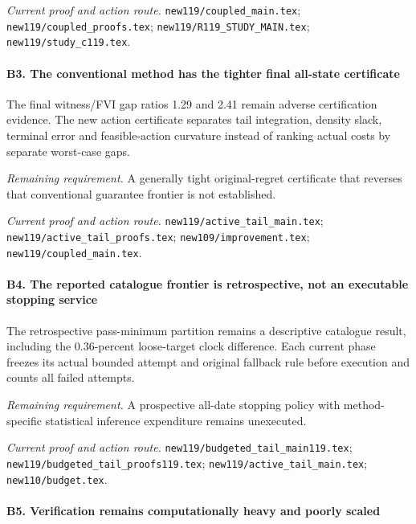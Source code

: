 \par\emph{Current proof and action route.} \nolinkurl{new119/coupled_main.tex}; \nolinkurl{new119/coupled_proofs.tex}; \nolinkurl{new119/R119_STUDY_MAIN.tex}; \nolinkurl{new119/study_c119.tex}.

\paragraph{B3. The conventional method has the tighter final all-state certificate}

The final witness/\allowbreak{}FVI gap ratios 1.29 and 2.41 remain adverse certification evidence. The new action certificate separates tail integration, density slack, terminal error and feasible-action curvature instead of ranking actual costs by separate worst-case gaps.

\par\emph{Remaining requirement.} A generally tight original-regret certificate that reverses that conventional guarantee frontier is not established.

\par\emph{Current proof and action route.} \nolinkurl{new119/active_tail_main.tex}; \nolinkurl{new119/active_tail_proofs.tex}; \nolinkurl{new109/improvement.tex}; \nolinkurl{new119/coupled_main.tex}.

\paragraph{B4. The reported catalogue frontier is retrospective, not an executable stopping service}

The retrospective pass-minimum partition remains a descriptive catalogue result, including the 0.36-percent loose-target clock difference. Each current phase freezes its actual bounded attempt and original fallback rule before execution and counts all failed attempts.

\par\emph{Remaining requirement.} A prospective all-date stopping policy with method-specific statistical inference expenditure remains unexecuted.

\par\emph{Current proof and action route.} \nolinkurl{new119/budgeted_tail_main119.tex}; \nolinkurl{new119/budgeted_tail_proofs119.tex}; \nolinkurl{new119/active_tail_main.tex}; \nolinkurl{new110/budget.tex}.

\paragraph{B5. Verification remains computationally heavy and poorly scaled}

